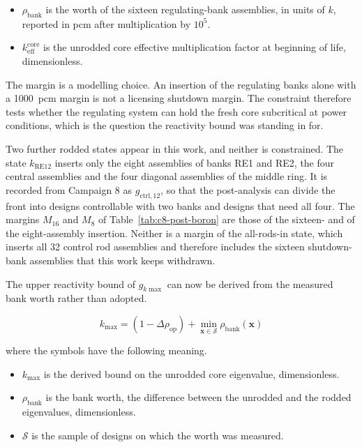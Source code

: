 \begin{itemize}
  \item $\rho_\mathrm{bank}$ is the worth of the sixteen regulating-bank
        assemblies, in units of $k$, reported in pcm after
        multiplication by $10^5$.

  \item $k_\mathrm{eff}^\mathrm{core}$ is the unrodded core effective
        multiplication factor at beginning of life, dimensionless.
\end{itemize}

The margin is a modelling choice. An insertion of the regulating banks
alone with a \SI{1000}{pcm} margin is not a licensing shutdown
margin. The constraint
therefore tests whether the regulating system can hold the fresh core
subcritical at power conditions, which is the question the reactivity
bound was standing in for.

Two further rodded states appear in this work, and neither is
constrained. The state $k_\mathrm{RE12}$ inserts only the eight
assemblies of banks RE1 and RE2, the four central assemblies and the
four diagonal assemblies of the middle ring. It is recorded from
Campaign 8 as $g_\mathrm{ctrl,12}$, so that the post-analysis can
divide the front into designs controllable with two banks and designs
that need all four. The margins $M_{16}$ and $M_{8}$ of
Table~\ref{tab:c8-post-boron} are those of the sixteen- and of the
eight-assembly insertion. Neither is a margin of the all-rods-in state,
which inserts all 32 control rod assemblies and therefore includes the
sixteen shutdown-bank assemblies that this work keeps
withdrawn.

The upper reactivity bound of $g_{k\max}$ can now be derived from the
measured bank worth rather than adopted.

\begin{equation}
k_{\max} = (1 - \Delta\rho_\mathrm{op}) + \min_{\mathbf{x} \in \mathcal{S}} \rho_\mathrm{bank}(\mathbf{x})
\label{eq:k-max-derived}
\end{equation}

\noindent where the symbols have the following meaning.

\begin{itemize}
  \item $k_{\max}$ is the derived bound on the unrodded core
        eigenvalue, dimensionless.

  \item $\rho_\mathrm{bank}$ is the bank worth, the difference between
        the unrodded and the rodded eigenvalues, dimensionless.

  \item $\mathcal{S}$ is the sample of designs on which the worth was
        measured.
\end{itemize}

